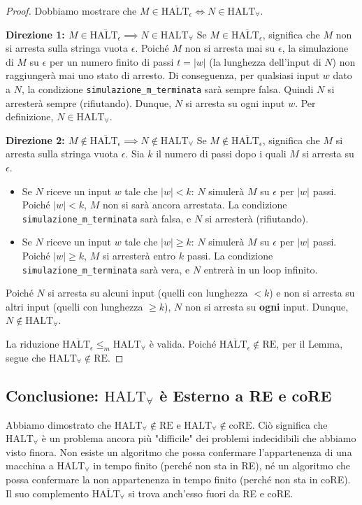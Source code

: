 \documentclass[a4paper]{article}
\begin{document}
\begin{proof}
Dobbiamo mostrare che $M \in \overline{\text{HALT}_\epsilon} \iff N \in \text{HALT}_\forall$.

\textbf{Direzione 1: $M \in \overline{\text{HALT}_\epsilon} \implies N \in \text{HALT}_\forall$}
Se $M \in \overline{\text{HALT}_\epsilon}$, significa che $M$ non si arresta sulla stringa vuota $\epsilon$.
Poiché $M$ non si arresta mai su $\epsilon$, la simulazione di $M$ su $\epsilon$ per un numero finito di passi $t = |w|$ (la lunghezza dell'input di $N$) non raggiungerà mai uno stato di arresto.
Di conseguenza, per qualsiasi input $w$ dato a $N$, la condizione \texttt{simulazione\_m\_terminata} sarà sempre falsa. Quindi $N$ si arresterà sempre (rifiutando).
Dunque, $N$ si arresta su ogni input $w$. Per definizione, $N \in \text{HALT}_\forall$.

\textbf{Direzione 2: $M \notin \overline{\text{HALT}_\epsilon} \implies N \notin \text{HALT}_\forall$}
Se $M \notin \overline{\text{HALT}_\epsilon}$, significa che $M$ si arresta sulla stringa vuota $\epsilon$.
Sia $k$ il numero di passi dopo i quali $M$ si arresta su $\epsilon$.
\begin{itemize}
    \item Se $N$ riceve un input $w$ tale che $|w| < k$:
    $N$ simulerà $M$ su $\epsilon$ per $|w|$ passi. Poiché $|w| < k$, $M$ non si sarà ancora arrestata. La condizione \texttt{simulazione\_m\_terminata} sarà falsa, e $N$ si arresterà (rifiutando).
    \item Se $N$ riceve un input $w$ tale che $|w| \ge k$:
    $N$ simulerà $M$ su $\epsilon$ per $|w|$ passi. Poiché $|w| \ge k$, $M$ si arresterà entro $k$ passi. La condizione \texttt{simulazione\_m\_terminata} sarà vera, e $N$ entrerà in un loop infinito.
\end{itemize}
Poiché $N$ si arresta su alcuni input (quelli con lunghezza $< k$) e non si arresta su altri input (quelli con lunghezza $\ge k$), $N$ non si arresta su \textbf{ogni} input.
Dunque, $N \notin \text{HALT}_\forall$.

La riduzione $\overline{\text{HALT}_\epsilon} \le_m \text{HALT}_\forall$ è valida.
Poiché $\overline{\text{HALT}_\epsilon} \notin \text{RE}$, per il Lemma, segue che $\text{HALT}_\forall \notin \text{RE}$.
\end{proof}

\subsection{Conclusione: $\text{HALT}_\forall$ è Esterno a RE e coRE}
Abbiamo dimostrato che $\text{HALT}_\forall \notin \text{RE}$ e $\text{HALT}_\forall \notin \text{coRE}$.
Ciò significa che $\text{HALT}_\forall$ è un problema ancora più "difficile" dei problemi indecidibili che abbiamo visto finora. Non esiste un algoritmo che possa confermare l'appartenenza di una macchina a $\text{HALT}_\forall$ in tempo finito (perché non sta in RE), né un algoritmo che possa confermare la non appartenenza in tempo finito (perché non sta in coRE).
Il suo complemento $\overline{\text{HALT}_\forall}$ si trova anch'esso fuori da RE e coRE.
\end{document}
